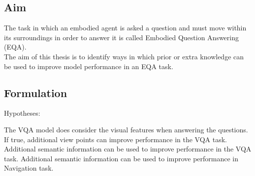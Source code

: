 \documentclass{article}
\begin{document}
\subsection{Aim}
The task in which an embodied agent is asked a question and must move within its surroundings in order to answer it is called Embodied Question Answering (EQA). \\
The aim of this thesis is to identify ways in which prior or extra knowledge can be used to improve model performance in an EQA task. 

\subsection{Formulation}

Hypotheses: 
\begin{outline}
	\1 The VQA model does consider the visual features when answering the questions.
		\2 If true, additional view points can improve performance in the VQA task. 
	\1 Additional semantic information can be used to improve performance in the VQA task. 
	\1 Additional semantic information can be used to improve performance in Navigation task. 
\end{outline}
\end{document}
